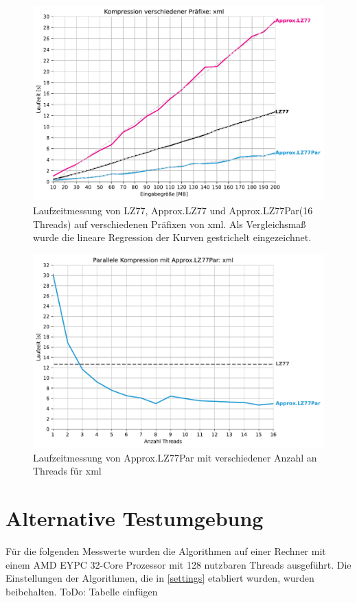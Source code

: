 \begin{figure}[ht]
    \centering
    \caption{Laufzeitmessung von LZ77, Approx.LZ77 und Approx.LZ77Par(16 Threads) auf verschiedenen Präfixen von xml. Als Vergleichsmaß wurde 
    die lineare Regression der Kurven gestrichelt eingezeichnet.}
    \includegraphics[scale=0.6]{Images/progressive_xml.pdf}
\end{figure}

\begin{figure}[ht]
    \centering
    \caption{Laufzeitmessung von Approx.LZ77Par mit verschiedener Anzahl an Threads für xml}
    \includegraphics[scale=0.6]{Images/progressive_speedup_xml.pdf}
\end{figure}

\section{Alternative Testumgebung}
Für die folgenden Messwerte wurden die Algorithmen auf einer Rechner mit einem AMD EYPC 32-Core Prozessor mit 128 nutzbaren Threads ausgeführt.
Die Einstellungen der Algorithmen, die in \ref{settings} etabliert wurden, wurden beibehalten.
ToDo: Tabelle einfügen